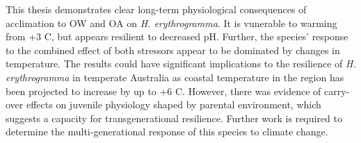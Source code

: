 This thesis demonstrates clear long-term physiological consequences of acclimation to OW and OA on \textit{H. erythrogramma}. 
It is vunerable to warming from +3 \degree C, but appears resilient to decreased pH.
Further, the species' response to the combined effect of both stressors appear to be dominated by changes in temperature.
The results could have significant implications to the resilience of \textit{H. erythrogramma} in temperate Australia as coastal temperature in the region has been projected to increase by up to +6 \degree C.
However, there was evidence of carry-over effects on juvenile physiology shaped by parental environment, which suggests a capacity for transgenerational resilience. 
Further work is required to determine the multi-generational response of this species to climate change.




\cleardoublepage

